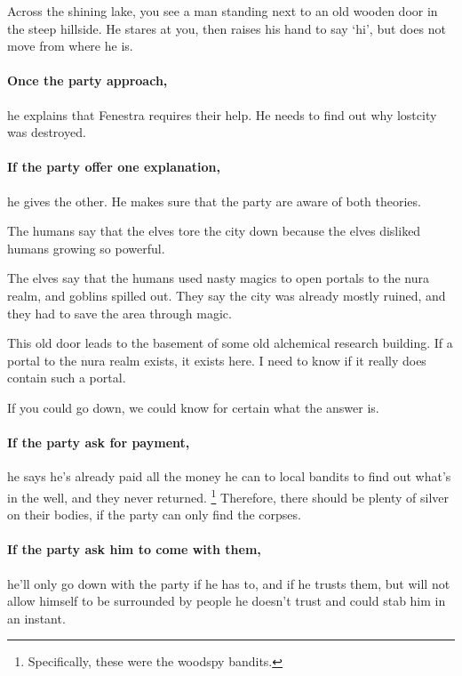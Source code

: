 \begin{multicols}{2}
\begin{boxtext}
  Across the shining lake, you see a man standing next to an old wooden door in the steep hillside.
  He stares at you, then raises his hand to say `hi', but does not move from where he is.

\end{boxtext}

\paragraph{Once the party approach,}
he explains that Fenestra requires their help.
He needs to find out why \gls{lostcity} was destroyed.

\paragraph{If the party offer one explanation,}
he gives the other.
He makes sure that the party are aware of both theories.

\begin{speechtext}

  The humans say that the elves tore the city down because the elves disliked humans growing so powerful.

  The elves say that the humans used nasty magics to open portals to the nura realm, and goblins spilled out.
  They say the city was already mostly ruined, and they had to save the area through magic.

  This old door leads to the basement of some old alchemical research building.
  If a portal to the nura realm exists, it exists here.
  I need to know if it really does contain such a portal.

  If you could go down, we could know for certain what the answer is.

\end{speechtext}

\paragraph{If the party ask for payment,}
he says he's already paid all the money he can to local bandits to find out what's in the well, and they never returned.%
\footnote{Specifically, these were the woodspy bandits.}
Therefore, there should be plenty of silver on their bodies, if the party can only find the corpses.

\paragraph{If the party ask him to come with them,}
he'll only go down with the party if he has to, and if he trusts them, but will not allow himself to be surrounded by people he doesn't trust and could stab him in an instant.


\end{multicols}
